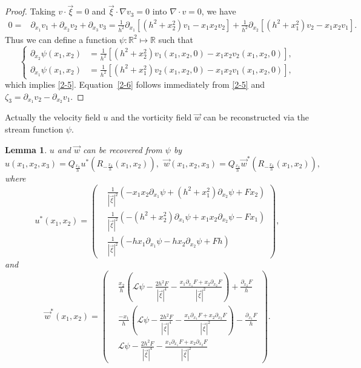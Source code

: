 \documentclass[12pt,reqno]{amsart}
\numberwithin{equation}{section}
\newtheorem{lemma}[theorem]{Lemma}
\theoremstyle{definition}
\theoremstyle{remark}
\begin{document}
\begin{proof}
Taking  $v\cdot \vec{\xi}=0$ and   $ \vec{\xi} \cdot\nabla v_3=0$ into $\nabla \cdot v=0$, we have
\begin{equation*} 
\begin{split}
0=&\partial_{x_1} v_1+\partial_{x_2} v_2+\partial_{x_3} v_3
=\frac{1}{h^2}\partial_{x_1}  \left[(h^2+x_2^2)v_1-x_1x_2v_2\right]+\frac{1}{h^2}\partial_{x_2}  \left[(h^2+x_1^2)v_2-x_1x_2v_1\right].
\end{split}
\end{equation*}
Thus we can define a function  $\psi: \mathbb R^2\mapsto \mathbb R$ such that 
\begin{equation*} 
\begin{cases}
\partial_{x_2} \psi(x_1,x_2)&=\frac{1}{h^2}\left[(h^2+x_2^2)v_1(x_1,x_2,0)-x_1x_2v_2(x_1,x_2,0)\right],\\
\partial_{x_1} \psi(x_1,x_2)&=\frac{1}{h^2}  \left[(h^2+x_1^2)v_2(x_1,x_2,0)-x_1x_2v_1(x_1,x_2,0)\right],
\end{cases}
\end{equation*}
which implies \eqref{2-5}. Equation~\eqref{2-6} follows immediately from  \eqref{2-5} and  $\zeta_3=\partial_{x_1} v_2-\partial_{x_2} v_1$.
\end{proof}
Actually the velocity field $ u $ and the vorticity field $ \vec{w} $ can be reconstructed  via the stream function $ \psi. $ 
\begin{lemma} \label{lm2-4-1}
$ u $ and   $ \vec{w} $ can be recovered from $ \psi $ by 
$$u(x_1,x_2,x_3)=Q_{\frac{x_3}{h}}u^*\left (R_{-\frac{x_3}{h}}(x_1,x_2)\right ),\ \ \vec{w}(x_1,x_2,x_3)=Q_{\frac{x_3}{h}}\vec{w}^*\left (R_{-\frac{x_3}{h}}(x_1,x_2)\right ),$$
where
\begin{equation*} 
u^*(x_1,x_2)=\begin{pmatrix}
& \frac{1}{|\vec{\xi}|^2}\left(-x_1x_2\partial_{x_1}\psi+(h^2+x_1^2)\partial_{x_2}\psi+F x_2 \right)\\
&\frac{1}{|\vec{\xi}|^2}\left(-(h^2+x_2^2)\partial_{x_1}\psi+x_1x_2\partial_{x_2}\psi-F x_1 \right)\\
&\frac{1}{|\vec{\xi}|^2}\left(-hx_1 \partial_{x_1}\psi-hx_2\partial_{x_2}\psi+F h \right)  
\end{pmatrix},
\end{equation*}
and 
\begin{equation}\label{2-5-2}
\vec{w}^*(x_1,x_2)=\begin{pmatrix}
& \frac{x_2}{h}\left(\mathcal{L}\psi-\frac{2h^2F}{|\vec{\xi}|^4}-\frac{x_1\partial_{x_1}F+x_2\partial_{x_2}F}{|\vec{\xi}|^2} \right)+\frac{\partial_{x_2}F}{h}\\
&\frac{-x_1}{h}\left(\mathcal{L}\psi-\frac{2h^2F}{|\vec{\xi}|^4}-\frac{x_1\partial_{x_1}F+x_2\partial_{x_2}F}{|\vec{\xi}|^2} \right)-\frac{\partial_{x_1}F}{h}\\
&\mathcal{L}\psi-\frac{2h^2F}{|\vec{\xi}|^4}-\frac{x_1\partial_{x_1}F+x_2\partial_{x_2}F}{|\vec{\xi}|^2} 
\end{pmatrix}.
\end{equation}
\end{lemma}
\end{document}
